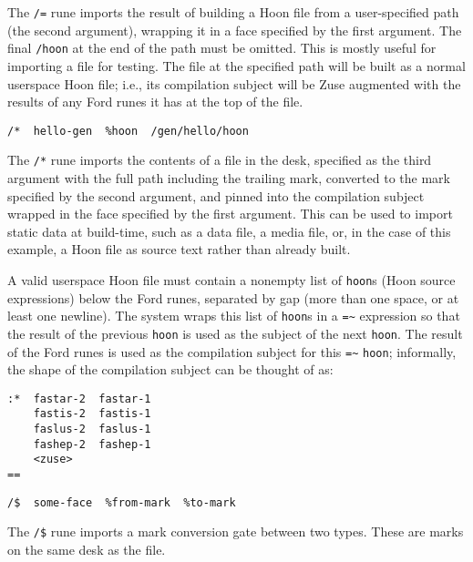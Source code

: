 \documentclass[twoside]{article}
\begin{document}
The \lstinline[style=inlinecode]{/=} rune imports the result of building a Hoon file from a user-specified path (the second argument), wrapping it in a face specified by the first argument. The final \lstinline[style=inlinecode]{/hoon} at the end of the path must be omitted. This is mostly useful for importing a file for testing. The file at the specified path will be built as a normal userspace Hoon file; i.e., its compilation subject will be Zuse augmented with the results of any Ford runes it has at the top of the file.

\begin{lstlisting}[style=listingcode]
/*  hello-gen  %hoon  /gen/hello/hoon
\end{lstlisting}

The \lstinline[style=inlinecode]{/*} rune imports the contents of a file in the desk, specified as the third argument with the full path including the trailing mark, converted to the mark specified by the second argument, and pinned into the compilation subject wrapped in the face specified by the first argument. This can be used to import static data at build-time, such as a data file, a media file, or, in the case of this example, a Hoon file as source text rather than already built.

A valid userspace Hoon file must contain a nonempty list of \lstinline[style=inlinecode]{hoon}s (Hoon source expressions) below the Ford runes, separated by gap (more than one space, or at least one newline). The system wraps this list of \lstinline[style=inlinecode]{hoon}s in a \lstinline[style=inlinecode]{=~} expression so that the result of the previous \lstinline[style=inlinecode]{hoon} is used as the subject of the next \lstinline[style=inlinecode]{hoon}. The result of the Ford runes is used as the compilation subject for this \lstinline[style=inlinecode]{=~} \lstinline[style=inlinecode]{hoon}; informally, the shape of the compilation subject can be thought of as:

\begin{lstlisting}[style=listingcode]
:*  fastar-2  fastar-1
    fastis-2  fastis-1
    faslus-2  faslus-1
    fashep-2  fashep-1
    <zuse>
==
\end{lstlisting}

\begin{lstlisting}[style=listingcode]
  /$  some-face  %from-mark  %to-mark
\end{lstlisting}

The \lstinline[style=inlinecode]{/$} rune imports a mark conversion gate between two types.  These are marks on the same desk as the file.
\end{document}
